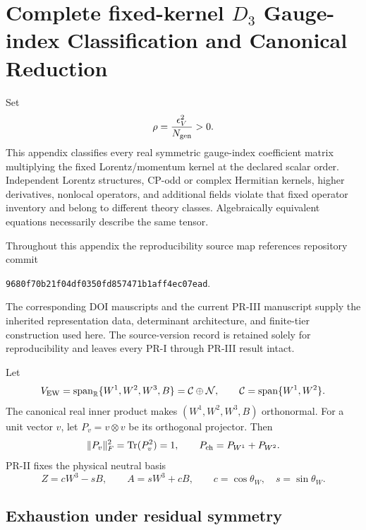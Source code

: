 \section{Complete fixed-kernel \texorpdfstring{$D_3$}{D3} Gauge-index Classification and Canonical Reduction}
\label{app:d3-coefficient-rigidity}

Set
\begin{equation}
 \rho=\frac{\epsilon_V^2}{N_{\rm gen}}>0.
 \label{eq:pr35-d3-rho}
\end{equation}
This appendix classifies every real symmetric gauge-index coefficient matrix multiplying the fixed Lorentz/momentum kernel at the declared scalar order. Independent Lorentz structures, CP-odd or complex Hermitian kernels, higher derivatives, nonlocal operators, and additional fields violate that fixed operator inventory and belong to different theory classes.  Algebraically equivalent equations necessarily describe the same tensor.

Throughout this appendix the reproducibility source map references repository commit
\begin{center}
\texttt{9680f70b21f04df0350fd857471b1aff4ec07ead}.
\end{center}
The corresponding DOI mauscripts and the current PR-III manuscript supply the inherited representation data, determinant architecture, and finite-tier construction used here.  The source-version record is retained solely for reproducibility and leaves every PR-I through PR-III result intact.

Let
\begin{equation}
 V_{\rm EW}=\operatorname{span}_{\mathbb R}
 \{W^1,W^2,W^3,B\}=\mathcal C\oplus\mathcal N,
 \qquad \mathcal C=\operatorname{span}\{W^1,W^2\}.
\end{equation}
The canonical real inner product makes $(W^1,W^2,W^3,B)$ orthonormal.  For a
unit vector $v$, let $P_v=v\otimes v$ be its orthogonal projector.  Then
\begin{equation}
 \|P_v\|_F^2=\operatorname{Tr}(P_v^2)=1,
 \qquad P_{\rm ch}=P_{W^1}+P_{W^2}.
 \label{eq:pr35-d3-projector-normalization}
\end{equation}
PR-II fixes the physical neutral basis \cite{PRII}
\begin{equation}
 Z=cW^3-sB,\qquad A=sW^3+cB,
 \qquad c=\cos\theta_W,\quad s=\sin\theta_W.
 \label{eq:pr35-d3-neutral-basis}
\end{equation}

\subsection{Exhaustion under residual symmetry}

